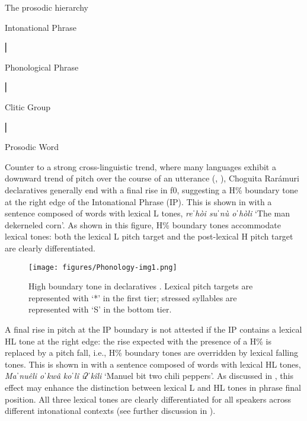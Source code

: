 \pagebreak

\ea\label{ex:6:prosodic hierarchy}
{The prosodic hierarchy}\mbox{}

   Intonational Phrase

     \hspace*{1cm}⎜

   Phonological Phrase

     \hspace*{1cm}⎜

   Clitic Group

     \hspace*{1cm}⎜

   Prosodic Word
   \z

Counter to a strong cross-linguistic trend, where many languages exhibit a downward trend of pitch over the course of an utterance (\citealt{cohen1982declination}, \citealt{ladd1984declination}), Choguita Rarámuri declaratives generally end with a final rise in f0, suggesting a H\% boundary tone at the right edge of the Intonational Phrase (IP). This is shown in  with a sentence composed of words with lexical L tones, \textit{reˈhòi suˈnù oˈhòli} `The man dekerneled corn'. As shown in this figure, H\% boundary tones accommodate lexical tones: both the lexical L pitch target and the post-lexical H pitch target are clearly differentiated.

\begin{figure}
\texttt{[image: figures/Phonology-img1.png]}
\caption{
\label{fig: H boundary tone in declaratives}
High boundary tone in declaratives \parencite{garellek2015lexical}. Lexical pitch targets are represented with `*' in the first tier; stressed syllables are represented with `S' in the bottom tier.}
\end{figure}

A final rise in pitch at the IP boundary is not attested if the IP contains a lexical HL tone at the right edge: the rise expected with the presence of a H\% is replaced by a pitch fall, i.e., H\% boundary tones are overridden by lexical falling tones. This is shown in  with a sentence composed of words with lexical HL tones, \textit{Maˈnuêli oˈkwâ koˈlî iʔˈkîli} `Manuel bit two chili peppers'. As discussed in \citet{garellek2015lexical}, this effect may enhance the distinction between lexical L and HL tones in phrase final position. All three lexical tones are clearly differentiated for all speakers across different intonational contexts (see further discussion in ).


